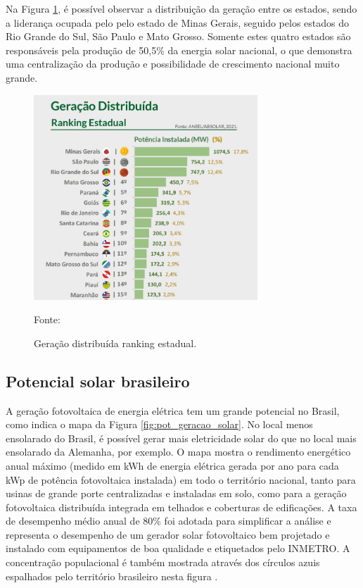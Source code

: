 Na Figura \ref{fig:solar_estados}, é possível observar a distribuição da geração entre os estados, sendo a liderança ocupada pelo pelo estado de Minas Gerais, seguido pelos estados do Rio Grande do Sul, São Paulo e Mato Grosso. Somente estes quatro estados são responsáveis pela produção de 50,5\% da energia solar nacional, o que demonstra uma centralização da produção e possibilidade de crescimento nacional muito grande.

\begin{figure}[H]
    \centering
    \includegraphics[width=0.75\textwidth]{./Figuras/solar_estados.jpg}
    \caption{Geração distribuída ranking estadual.}{Fonte: \cite{ABSOLAR}}
   \label{fig:solar_estados}
\end{figure}

\subsection{Potencial solar brasileiro}

A geração fotovoltaica de energia elétrica tem um grande potencial no Brasil, como indica o mapa da Figura \ref{fig:pot_geracao_solar}. No local menos ensolarado do Brasil, é possível gerar mais eletricidade solar do que no local mais ensolarado da Alemanha, por exemplo. O mapa mostra o rendimento energético anual máximo (medido em kWh de energia elétrica gerada por ano para cada kWp de potência fotovoltaica instalada) em todo o território nacional, tanto para usinas de grande porte centralizadas e instaladas em solo, como para a geração fotovoltaica distribuída integrada em telhados e coberturas de edificações. A taxa de desempenho médio anual de 80\% foi adotada para simplificar a análise e representa o desempenho de um gerador solar fotovoltaico bem projetado e instalado com equipamentos de boa qualidade e etiquetados pelo INMETRO. A concentração populacional é também mostrada através dos círculos azuis espalhados pelo território brasileiro nesta figura \cite{atlas2017}. 

